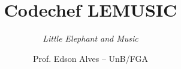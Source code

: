 \title{Codechef LEMUSIC}
\subtitle{\textit{Little Elephant and Music}}
\author{Prof. Edson Alves -- UnB/FGA}
\date{}
